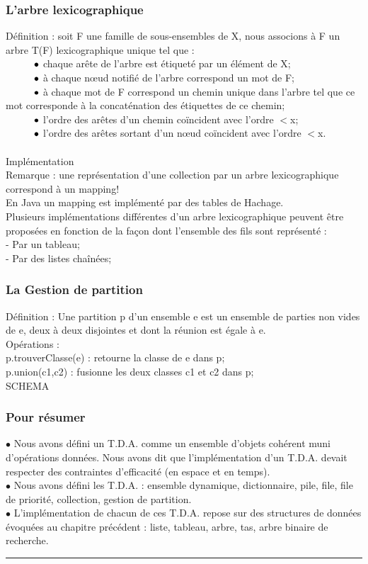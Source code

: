 \documentclass[5pt]{article}
\newcommand\tab[1][1cm]{\hspace*{#1}}
\begin{document}
\begin{scriptsize}
\subsubsection{L’arbre lexicographique }
Définition : soit F une famille de sous-ensembles de X, nous associons à F un arbre T(F) lexicographique unique tel que : \\
$\tab\bullet$ chaque arête de l’arbre est étiqueté par un élément de X; \\
$\tab\bullet$ à chaque nœud notifié de l’arbre correspond un mot de F; \\
$\tab\bullet$ à chaque mot de F correspond un chemin unique dans l’arbre tel que ce mot corresponde à la concaténation des étiquettes de ce chemin; \\
$\tab\bullet$ l’ordre des arêtes d’un chemin coïncident avec l’ordre $<$x; \\
$\tab\bullet$ l’ordre des arêtes sortant d’un nœud coïncident avec l’ordre $<$x.\\
\\
Implémentation\\
Remarque : une représentation d’une collection  par un arbre lexicographique correspond à un  mapping! \\
En Java un mapping est implémenté par des  tables de Hachage.\\ 
Plusieurs implémentations différentes d’un arbre  lexicographique peuvent être proposées en  fonction de la façon dont l’ensemble des fils sont  représenté :\\
- Par un tableau;\\
- Par des listes chaînées; 
\subsubsection{La Gestion de partition}
Définition : Une partition p d’un ensemble e est un ensemble de parties non vides de e, deux à deux disjointes et dont la réunion est égale à e.\\
Opérations :\\
p.trouverClasse(e) : retourne la classe de e dans p;\\
p.union(c1,c2) : fusionne les deux classes c1 et c2 dans p;\\
SCHEMA\\
\subsubsection{Pour résumer }
$\bullet$ Nous avons défini un T.D.A. comme un ensemble d’objets cohérent muni d’opérations données. Nous avons dit que l’implémentation d’un T.D.A. devait respecter des contraintes d’efficacité (en espace et en temps).\\
$\bullet$ Nous avons défini les T.D.A. : ensemble dynamique, dictionnaire, pile, file, file de priorité,  collection, gestion de partition.\\ 
$\bullet$ L’implémentation de chacun de ces T.D.A. repose sur des structures de données évoquées au chapitre précédent : liste, tableau, arbre, tas, arbre binaire de recherche. \\
\hrule\noindent

\end{scriptsize}
\end{document}

